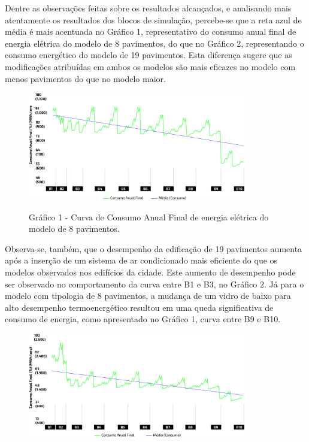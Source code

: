 \begin{onehalfspace}
    \noindent Dentre as observações feitas sobre os resultados alcançados, e analisando 
    mais atentamente os resultados dos blocos de simulação, percebe-se que a reta azul de 
    média é mais acentuada no Gráfico 1, representativo do consumo anual final de energia 
    elétrica do modelo de 8 pavimentos, do que no Gráfico 2, representando o consumo 
    energético do modelo de 19 pavimentos. Esta diferença sugere que as modificações 
    atribuídas em ambos os modelos são mais eficazes no modelo com menos pavimentos do que 
    no modelo maior.\vspace*{0.3cm}
    \begin{figure}[ht]
        \centering
        \includegraphics[width=0.85\textwidth]{figures/grafico-8pav.png}
        \begin{center}
            \scriptsize Gráfico 1 - Curva de Consumo Anual Final de energia elétrica do modelo de 8 pavimentos.
        \end{center}
    \end{figure}
    \noindent Observa-se, também, que o desempenho da edificação de 19 pavimentos aumenta 
    após a inserção de um sistema de ar condicionado mais eficiente do que os modelos 
    observados nos edifícios da cidade. Este aumento de desempenho pode ser observado no 
    comportamento da curva entre B1 e B3, no Gráfico 2. Já para o modelo com tipologia de 
    8 pavimentos, a mudança de um vidro de baixo para alto desempenho termoenergético resultou 
    em uma queda significativa de consumo de energia, como apresentado no Gráfico 1, curva 
    entre B9 e B10.\vspace*{0.3cm}
    \begin{figure}[ht]
        \centering
        \includegraphics[width=0.85\textwidth]{figures/grafico-19pav.png}

\end{figure}
\end{onehalfspace}
